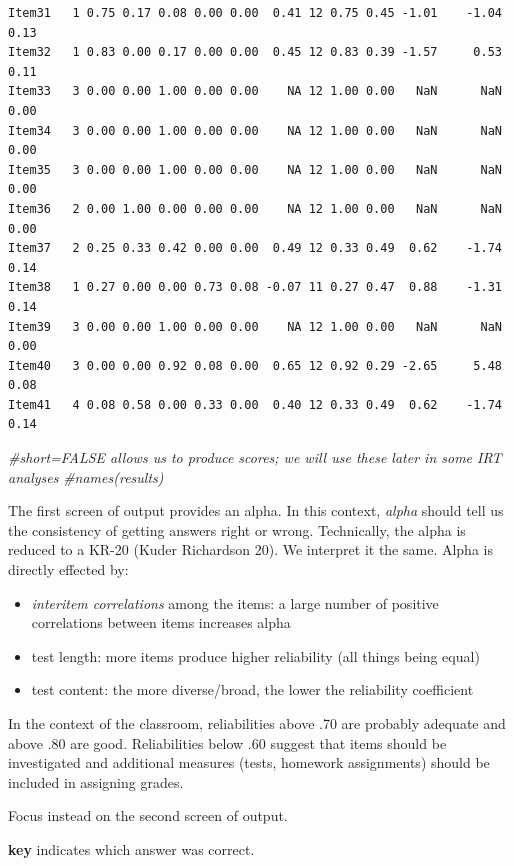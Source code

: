 \documentclass[
  english,
]{book}
\newenvironment{Shaded}{\begin{snugshade}}{\end{snugshade}}
\newcommand{\CommentTok}[1]{\textcolor[rgb]{0.56,0.35,0.01}{\textit{#1}}}
\providecommand{\tightlist}{%
  \setlength{\itemsep}{0pt}\setlength{\parskip}{0pt}}
\begin{document}
\begin{verbatim}
Item31   1 0.75 0.17 0.08 0.00 0.00  0.41 12 0.75 0.45 -1.01    -1.04 0.13
Item32   1 0.83 0.00 0.17 0.00 0.00  0.45 12 0.83 0.39 -1.57     0.53 0.11
Item33   3 0.00 0.00 1.00 0.00 0.00    NA 12 1.00 0.00   NaN      NaN 0.00
Item34   3 0.00 0.00 1.00 0.00 0.00    NA 12 1.00 0.00   NaN      NaN 0.00
Item35   3 0.00 0.00 1.00 0.00 0.00    NA 12 1.00 0.00   NaN      NaN 0.00
Item36   2 0.00 1.00 0.00 0.00 0.00    NA 12 1.00 0.00   NaN      NaN 0.00
Item37   2 0.25 0.33 0.42 0.00 0.00  0.49 12 0.33 0.49  0.62    -1.74 0.14
Item38   1 0.27 0.00 0.00 0.73 0.08 -0.07 11 0.27 0.47  0.88    -1.31 0.14
Item39   3 0.00 0.00 1.00 0.00 0.00    NA 12 1.00 0.00   NaN      NaN 0.00
Item40   3 0.00 0.00 0.92 0.08 0.00  0.65 12 0.92 0.29 -2.65     5.48 0.08
Item41   4 0.08 0.58 0.00 0.33 0.00  0.40 12 0.33 0.49  0.62    -1.74 0.14
\end{verbatim}

\begin{Shaded}
\begin{Highlighting}[]
\CommentTok{#short=FALSE allows us to produce scores; we will use these later in some IRT analyses}
\CommentTok{#names(results)}
\end{Highlighting}
\end{Shaded}

The first screen of output provides an alpha. In this context, \emph{alpha} should tell us the consistency of getting answers right or wrong. Technically, the alpha is reduced to a KR-20 (Kuder Richardson 20). We interpret it the same. Alpha is directly effected by:

\begin{itemize}
\tightlist
\item
  \emph{interitem correlations} among the items: a large number of positive correlations between items increases alpha
\item
  test length: more items produce higher reliability (all things being equal)
\item
  test content: the more diverse/broad, the lower the reliability coefficient
\end{itemize}

In the context of the classroom, reliabilities above .70 are probably adequate and above .80 are good. Reliabilities below .60 suggest that items should be investigated and additional measures (tests, homework assignments) should be included in assigning grades.

Focus instead on the second screen of output.

\textbf{key} indicates which answer was correct.
\end{document}
